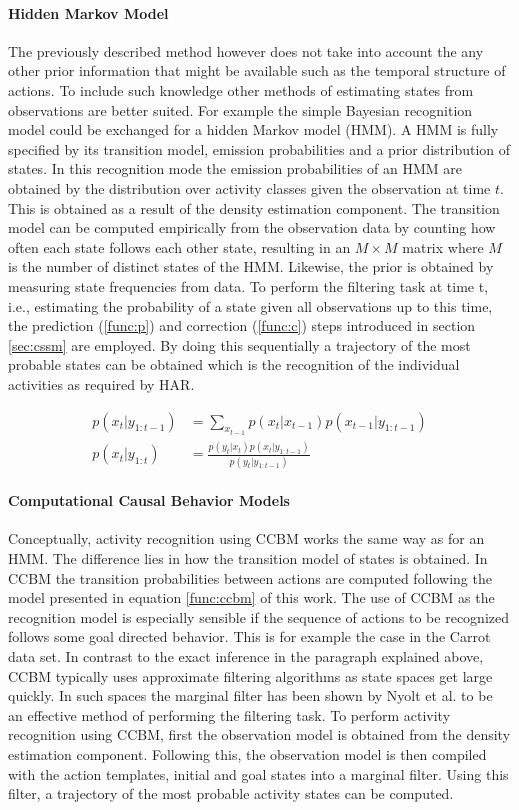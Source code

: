 \documentclass[11pt,titlepage,oneside,openany]{book}
\begin{document}
\paragraph{Hidden Markov Model}
The previously described method however does not take into account the any other prior information that might be available such as the temporal structure of actions. To include such knowledge other methods of estimating states from observations are better suited. For example the simple Bayesian recognition model could be exchanged for a hidden Markov model (HMM). A HMM is fully specified by its transition model, emission probabilities and a prior distribution of states. In this recognition mode the emission probabilities of an HMM are obtained by the distribution over activity classes given the observation at time $t$. This is obtained as a result of the density estimation component. The transition model can be computed empirically from the observation data by counting how often each state follows each other state, resulting in an $M \times M$ matrix where $M$ is the number of distinct states of the HMM. Likewise, the prior is obtained by measuring state frequencies from data. To perform the filtering task at time t, i.e., estimating the probability of a state given all observations up to this time, the prediction (\ref{func:p}) and correction (\ref{func:c}) steps introduced in section \ref{sec:cssm} are employed. By doing this sequentially a trajectory of the most probable states can be obtained which is the recognition of the individual activities as required by HAR.

\begin{align}
	p(x_t|y_{1:t-1}) &= \sum_{x_{t-1}} p(x_t|x_{t-1}) p(x_{t-1}|y_{1:t-1}) \label{func:p} \\
	p(x_t|y_{1:t}) &= \frac{p(y_t|x_t) p(x_t|y_{1:t-1})}{p(y_t|y_{1:t-1})} \label{func:c}
\end{align}

\paragraph{Computational Causal Behavior Models}
Conceptually, activity recognition using CCBM works the same way as for an HMM. The difference lies in how the transition model of states is obtained. In CCBM the transition probabilities between actions are computed following the model presented in equation \ref{func:ccbm} of this work. The use of CCBM as the recognition model is especially sensible if the sequence of actions to be recognized follows some goal directed behavior. This is for example the case in the Carrot data set. In contrast to the exact inference in the paragraph explained above, CCBM typically uses approximate filtering algorithms as state spaces get large quickly. In such spaces the marginal filter has been shown by Nyolt et al. \cite{nyolt_marginal_2015} to be an effective method of performing the filtering task. To perform activity recognition using CCBM, first the observation model is obtained from the density estimation component. Following this, the observation model is then compiled with the action templates, initial and goal states into a marginal filter. Using this filter, a trajectory of the most probable activity states can be computed.
\end{document}
